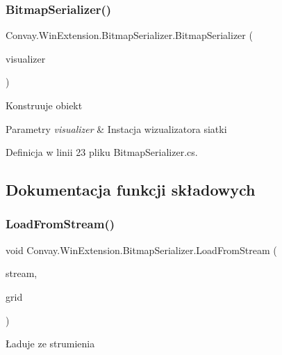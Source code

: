 \subsubsection{\texorpdfstring{Bitmap\+Serializer()}{BitmapSerializer()}}
{\footnotesize\ttfamily Convay.\+Win\+Extension.\+Bitmap\+Serializer.\+Bitmap\+Serializer (\begin{DoxyParamCaption}\item[{\hyperlink{interface_convay_1_1_win_extension_1_1_i_visualizer}{I\+Visualizer}}]{visualizer }\end{DoxyParamCaption})}



Konstruuje obiekt 


\begin{DoxyParams}{Parametry}
{\em visualizer} & Instacja wizualizatora siatki\\
\hline
\end{DoxyParams}


Definicja w linii 23 pliku Bitmap\+Serializer.\+cs.



\subsection{Dokumentacja funkcji składowych}
\hypertarget{class_convay_1_1_win_extension_1_1_bitmap_serializer_ab92b6c14cd7febe69f9dbc03cb3f2e3b}{}\label{class_convay_1_1_win_extension_1_1_bitmap_serializer_ab92b6c14cd7febe69f9dbc03cb3f2e3b} 
\subsubsection{\texorpdfstring{Load\+From\+Stream()}{LoadFromStream()}}
{\footnotesize\ttfamily void Convay.\+Win\+Extension.\+Bitmap\+Serializer.\+Load\+From\+Stream (\begin{DoxyParamCaption}\item[{Stream}]{stream,  }\item[{\hyperlink{interface_convay_1_1_core_1_1_interfaces_1_1_i_grid}{I\+Grid}}]{grid }\end{DoxyParamCaption})}



Ładuje ze strumienia 


